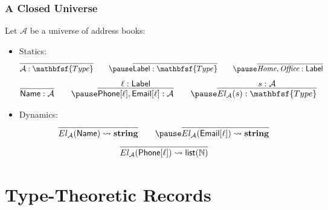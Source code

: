 \documentclass[12pt]{beamer}
\def\Type{\mathbfsf{Type}}
\begin{document}
\begin{frame}
  \frametitle{A Closed Universe}
  \pause
  Let $\mathcal{A}$ be a universe of address books:
  \pause
  \begin{itemize}
    \item Statics:
      \pause
      \[
        \infer{\mathcal{A} : \Type}{}
        \qquad
        \pause
        \infer{\textsf{Label} : \Type}{}
        \qquad
        \pause
        \infer{\textit{Home}, \textit{Office} : \textsf{Label}}{}
      \]
      \pause
      \[
        \infer{\textsf{Name} : \mathcal{A}}{}
        \qquad
        \pause
        \infer{\textsf{Phone}[\ell],\textsf{Email}[\ell] : \mathcal{A}}{\ell : \textsf{Label}}
        \qquad
        \pause
        \infer{El_\mathcal{A}(s) : \Type}{s : \mathcal{A}}
      \]
      \pause
    \item Dynamics:
      \pause
      \[
        \infer{El_\mathcal{A}(\textsf{Name}) \leadsto \mathbf{string}}{}
        \qquad
        \pause
        \infer{El_\mathcal{A}(\textsf{Email}[\ell]) \leadsto \mathbf{string}}{}
      \]
      \pause
      \[
        \infer{El_\mathcal{A}(\textsf{Phone}[\ell]) \leadsto \mathsf{list}(\mathbb{N})}{}
      \]
  \end{itemize}
\end{frame}


\section{Type-Theoretic Records}
\end{document}
